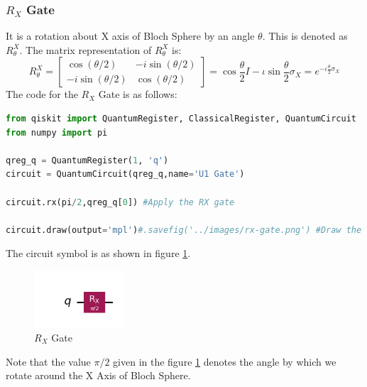 \documentclass[12pt, oneside]{book}
\theoremstyle{definition}
\theoremstyle{definition}
\theoremstyle{remark}
\begin{document}
\subsubsection{$R_X$ Gate}
It is a rotation about X axis of Bloch Sphere by an angle $\theta$. This is denoted
as $R^{X}_{\theta}$.
The matrix representation of $R^{X}_{\theta}$ is:
\[
    R^{X}_{\theta}=\begin{bmatrix}
        \cos(\theta/2) & -i\sin(\theta/2) \\
        -i\sin(\theta/2) & \cos(\theta/2)
    \end{bmatrix}=\cos \frac{\theta}{2}I-\iota \sin\frac{\theta}{2}\sigma_X=e^{-\iota\frac{\theta}{2}\sigma_X}
\]
The code for the $R_X$ Gate is as follows:
\begin{lstlisting}[language=Python]
from qiskit import QuantumRegister, ClassicalRegister, QuantumCircuit
from numpy import pi

qreg_q = QuantumRegister(1, 'q')
circuit = QuantumCircuit(qreg_q,name='U1 Gate')

circuit.rx(pi/2,qreg_q[0]) #Apply the RX gate

circuit.draw(output='mpl')#.savefig('../images/rx-gate.png') #Draw the circuit
\end{lstlisting}

The circuit symbol is as shown in figure \ref{fig:rx}.
\begin{figure}[H]
    \centering
    \includegraphics[width=0.3\textwidth]{../images/rx-gate.png}
    \caption{$R_X$ Gate}
    \label{fig:rx}
\end{figure}
Note that the value $\pi/2$ given in the figure \ref{fig:rx} denotes the angle by which we rotate around the X Axis of Bloch Sphere.
\end{document}
